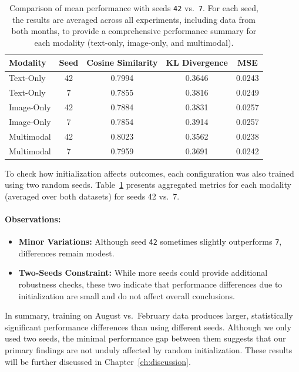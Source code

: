 \begin{table}[ht]
    \centering
    \begin{tabular}{lcccc}
    \toprule
    \textbf{Modality} & \textbf{Seed} & \textbf{Cosine Similarity} & \textbf{KL Divergence} & \textbf{MSE} \\
    \midrule
    Text-Only & 42 & 0.7994 &  0.3646 & 0.0243 \\
    Text-Only & 7 & 0.7855 &  0.3816 & 0.0249 \\
    \midrule
    Image-Only & 42 & 0.7884 & 0.3831 & 0.0257 \\
    Image-Only & 7 & 0.7854 & 0.3914 & 0.0257 \\
    \midrule
    Multimodal & 42 & 0.8023 & 0.3562 & 0.0238 \\
    Multimodal & 7 & 0.7959 & 0.3691 & 0.0242 \\
    \bottomrule
    \end{tabular}%
    \caption{Comparison of mean performance with seeds \texttt{42} vs.\ \texttt{7}.
    For each seed, the results are averaged across all experiments, including data from both months, to provide a comprehensive performance summary for each modality (text-only, image-only, and multimodal).}
    \label{tab:dataset_comparison_seed}
\end{table}

To check how initialization affects outcomes, each configuration was also trained using two random seeds. Table~\ref{tab:dataset_comparison_seed} presents aggregated metrics for each modality (averaged over both datasets) for seeds 42 vs.\ 7.


\paragraph{Observations:}
\begin{itemize}
    \item \textbf{Minor Variations:} Although seed \texttt{42} sometimes slightly outperforms \texttt{7}, differences remain modest.
    \item \textbf{Two-Seeds Constraint:} While more seeds could provide additional robustness checks, these two indicate that performance differences due to initialization are small and do not affect overall conclusions.
\end{itemize}

\noindent
In summary, training on August vs.\ February data produces larger, statistically significant performance differences than using different seeds. Although we only used two seeds, the minimal performance gap between them suggests that our primary findings are not unduly affected by random initialization. These results will be further discussed in Chapter~\ref{ch:discussion}.

